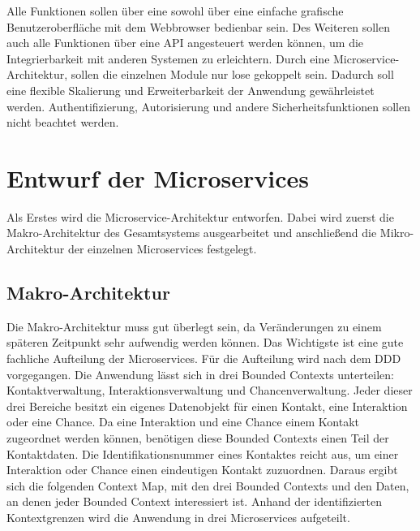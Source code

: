 Alle Funktionen sollen über eine sowohl über eine einfache grafische Benutzeroberfläche mit dem Webbrowser bedienbar sein. Des Weiteren sollen auch alle Funktionen über eine API angesteuert werden können, um die Integrierbarkeit mit anderen Systemen zu erleichtern. Durch eine Microservice-Architektur, sollen die einzelnen Module nur lose gekoppelt sein. Dadurch soll eine flexible Skalierung und Erweiterbarkeit der Anwendung gewährleistet werden. Authentifizierung, Autorisierung und andere Sicherheitsfunktionen sollen nicht beachtet werden.

\clearpage
\section{Entwurf der Microservices}

Als Erstes wird die Microservice-Architektur entworfen. Dabei wird zuerst die Makro-Architektur des Gesamtsystems ausgearbeitet und anschließend die Mikro-Architektur der einzelnen Microservices festgelegt.

\subsection{Makro-Architektur}

Die Makro-Architektur muss gut überlegt sein, da Veränderungen zu einem späteren Zeitpunkt sehr aufwendig werden können. Das Wichtigste ist eine gute fachliche Aufteilung der Microservices. Für die Aufteilung wird nach dem \ac{DDD} vorgegangen. Die Anwendung lässt sich in drei Bounded Contexts unterteilen: Kontaktverwaltung, Interaktionsverwaltung und Chancenverwaltung. Jeder dieser drei Bereiche besitzt ein eigenes Datenobjekt für einen Kontakt, eine Interaktion oder eine Chance. Da eine Interaktion und eine Chance einem Kontakt zugeordnet werden können, benötigen diese Bounded Contexts einen Teil der Kontaktdaten. Die Identifikationsnummer eines Kontaktes reicht aus, um einer Interaktion oder Chance einen eindeutigen Kontakt zuzuordnen. Daraus ergibt sich die folgenden Context Map, mit den drei Bounded Contexts und den Daten, an denen jeder Bounded Context interessiert ist. Anhand der identifizierten Kontextgrenzen wird die Anwendung in drei Microservices aufgeteilt.

